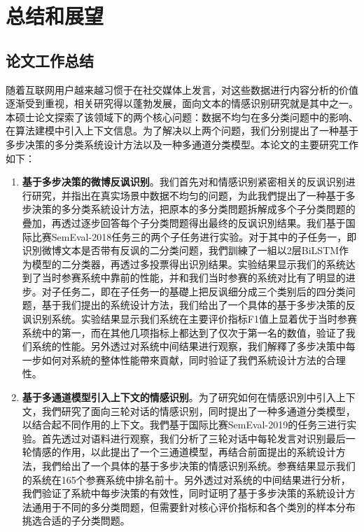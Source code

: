 \chapter{总结和展望}
\label{cha:conclusion}

\section{论文工作总结}

随着互联网用户越来越习惯于在社交媒体上发言，对这些数据进行内容分析的价值逐渐受到重视，相关研究得以蓬勃发展，面向文本的情感识别研究就是其中之一。本硕士论文探索了该领域下的两个核心问题：数据不均匀在多分类问题中的影响、在算法建模中引入上下文信息。为了解决以上两个问题，我们分别提出了一种基于多步决策的多分类系统设计方法以及一种多通道分类模型。本论文的主要研究工作如下：

\begin{enumerate}

\item {\bf 基于多步决策的微博反讽识别}。我们首先对和情感识别紧密相关的反讽识别进行研究，并指出在真实场景中数据不均匀的问题，为此我們提出了一种基于多步決策的多分类系統设计方法，把原本的多分类問题拆解成多个子分类問题的疊加，再透过逐步回答每个子分类問题得出最终的反讽识別结果。我们基于国际比赛SemEval-2018任务三的两个子任务进行实验。对于其中的子任务一，即识別微博文本是否带有反讽的二分类问题，我們訓練了一組以2层BiLSTM作为模型的二分类器，再透过多投票得出识別结果。实验结果显示我们的系统达到了当时参赛系统中靠前的性能，并和我们当时参赛的系统对比有了明显的进步。对子任务二，即在子任务一的基礎上把反讽细分成三个类别后的四分类问题，基于我们提出的系统设计方法，我们给出了一个具体的基于多步决策的反讽识别系统。实验结果显示我们系统在主要评价指标F1值上显着优于当时参赛系统中的第一，而在其他几项指标上都达到了仅次于第一名的数值，验证了我们系统的性能。另外透过对系统中间结果进行观察，我们解釋了多步决策中每一步如何对系統的整体性能帶來貢献，同时验证了我們系統设计方法的合理性。

\item {\bf 基于多通道模型引入上下文的情感识别}。为了研究如何在情感识別中引入上下文，我們研究了面向三轮对话的情感识别，同时提出了一种多通道分类模型，以结合起不同作用的上下文。我們基于国际比赛SemEval-2019的任务三进行实验。首先透过对语料进行观察，我们分析了三轮对话中每轮发言对识别最后一轮情感的作用，以此提出了一个三通道模型，再结合前面提出的系統设计方法，我們给出了一个具体的基于多步决策的情感识别系统。参赛结果显示我们的系统在165个参赛系统中排名前十。另外透过对系统的中间结果进行分析，我們验证了系統中每步決策的有效性，同时证明了基于多步決策的系統设计方法通用于不同的多分类問题，但需要針对核心评价指标和各个类別的样本分布挑选合适的子分类問题。

\end{enumerate}

